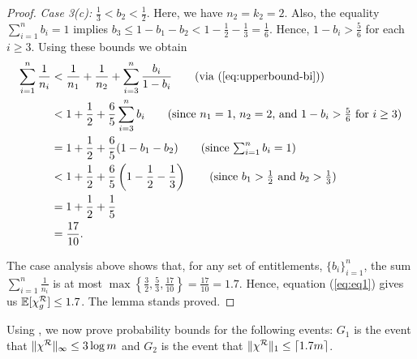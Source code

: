 \begin{proof}
    \emph{Case 3(c):} $\frac{1}{3} < b_2 < \frac{1}{2}$. Here, we have $n_2 = k_2 = 2$. Also, the equality $\sum_{i=1}^n b_i = 1$ implies $b_3 \leq 1-b_1 -b_2 < 1-\frac{1}{2} -\frac{1}{3} =\frac{1}{6}$. Hence, $1-b_i>\frac{5}{6}$ for each $i\geq 3$. Using these bounds we obtain    
    \begin{align*}
    \sum_{i=1}^n \frac{1}{n_i} 
    &<  \frac{1}{n_1} + \frac{1}{n_2} + \sum_{i=3}^n \frac{b_i}{1-b_i} \tag{via (\ref{eq:upperbound-bi})} \\ 
    & < 1 + \frac{1}{2} + \frac{6}{5} \sum_{i=3}^n b_i \tag{since $n_1 = 1$, $n_2 = 2$, and $1 - b_i> \frac{5}{6}$ for $i\geq 3$} \\
    & = 1 + \frac{1}{2} + \frac{6}{5}(1-b_1-b_2)  \tag{since $\sum_{i=1}^n b_i = 1$}\\
    & <  1 + \frac{1}{2} + \frac{6}{5} \left(1-\frac{1}{2}-\frac{1}{3}\right) \tag{since $b_1 >\frac{1}{2}$ and $ b_2 > \frac{1}{3}$} \\
    &= 1+ \frac{1}{2} + \frac{1}{5} \nonumber \\
    &= \frac{17}{10}.  
    \end{align*}

The case analysis above shows that, for any set of entitlements, $\{b_i\}_{i=1}^n$, the sum $\sum_{i=1}^n \frac{1}{n_i}$ is at most $\max \left\{\frac{3}{2}, \frac{5}{3}, \frac{17}{10} \right\} = \frac{17}{10} = 1.7$. Hence, equation (\ref{eq:eq1}) gives us $\mathbb{E}[\chi^{\mathcal{R}}_g] \leq 1.7$. The lemma stands proved. 
\end{proof}

Using , we now prove probability bounds for the following events: $G_1$ is the event that $\|\chi^{\mathcal{R}}\|_\infty \leq 3 \log m$ and $G_2$ is the event that $\|\chi^{\mathcal{R}}\|_1 \leq \lceil 1.7m \rceil$. 

